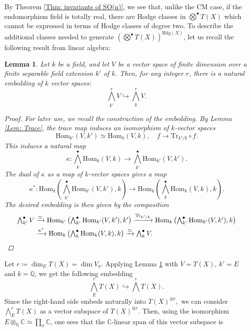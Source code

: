 \documentclass[11pt,twoside,a4paper]{amsart}
\newcommand{\0}{\mathscr{O}}
\newcommand{\Q}{\mathbb{Q}}
\newcommand{\C}{\mathbb{C}}
\newcommand{\s}{\sigma}
\theoremstyle{plain}
\newtheorem{lem}[thm]{Lemma}
\theoremstyle{definition}
\theoremstyle{remark}
\begin{document}
By Theorem \ref{Thm: invariants of SO(n)}, we see that, unlike the CM case, if the endomorphism field is totally real, there are Hodge classes in $\bigotimes^{\bullet}T(X)$ which cannot be expressed in terms of Hodge classes of degree two. To describe the additional classes needed to generate $\left(\bigotimes^{\bullet}T(X)\right)^{\mathrm{Hdg}(X)}$, let us recall the following result from linear algebra:
\begin{lem}\cite[Lem.\ 4.3]{deligne1982hodge}
\label{Lem.: wedge and field extensions}
Let $k$ be a field, and let $V$ be a vector space of finite dimension over a finite separable field extension $k'$ of $k$. Then, for any integer $r$, there is a natural embedding of $k$ vector spaces:
\[
\textstyle\bigwedge^r_{k'} V\hookrightarrow \bigwedge^r_{k}V.
\]
\begin{proof}
For later use, we recall the construction of the embedding.
By Lemma \ref{Lem: Trace}, the trace map induces an isomorphism of $k$-vector spaces
\[\mathrm{Hom}_{k'}(V,k')\simeq \mathrm{Hom}_k(V,k),\quad f\rightarrow\mathrm{Tr}_{k'/k}\circ f.\]
This induces a natural map
\[
\kappa\colon\textstyle\bigwedge_k^{\bullet}\mathrm{Hom}_k(V,k)\rightarrow\bigwedge_{k'}^{\bullet}\mathrm{Hom}_{k'}(V,k').
\]
The dual of $\kappa$ as a map of $k$-vector spaces gives a map
\[
\kappa^*\colon\textstyle\mathrm{Hom}_k\left(\bigwedge_{k'}^{\bullet}\mathrm{Hom}_{k'}(V,k'),k\right)\rightarrow\mathrm{Hom}_k\left(\bigwedge_{k}^{\bullet}\mathrm{Hom}_{k}(V,k),k\right).\]
The desired embedding is then given by the composition
\begin{align*}
    \textstyle\bigwedge^{\bullet}_{k'} V&\textstyle\xrightarrow{\simeq} \mathrm{Hom}_{k'}\left(\bigwedge_{k'}^{\bullet}\mathrm{Hom}_{k'}(V,k'),k'\right)\xrightarrow{\mathrm{Tr}_{k'/k}} \mathrm{Hom}_{k}\left(\bigwedge_{k'}^{\bullet}\mathrm{Hom}_{k'}(V,k'),k\right)\\
    &\textstyle\xrightarrow{\kappa^*}\mathrm{Hom}_k\left(\bigwedge_{k}^{\bullet}\mathrm{Hom}_{k}(V,k),k\right)\xrightarrow{\simeq}\bigwedge^{\bullet}_{k}V.\qedhere
\end{align*}
\end{proof}
\end{lem}
Let $r\coloneqq \dim_E T(X)=\dim V_\s$. Applying Lemma \ref{Lem.: wedge and field extensions} with $V=T(X)$, $k'=E$ and $k=\Q$, we get the following embedding
\[
\textstyle\bigwedge^r_{E}T(X)\hookrightarrow \bigwedge^r T(X).
\]
Since the right-hand side embeds naturally into $T(X)^{\otimes r},$ we can consider $\bigwedge^r_{E}T(X)$ as a vector subspace of $T(X)^{\otimes r}.$ Then, using the isomorphism $E\otimes_\Q \C\simeq\prod_{\sigma}\C$, one sees that the $\C$-linear span of this vector subspace is 
\end{document}
